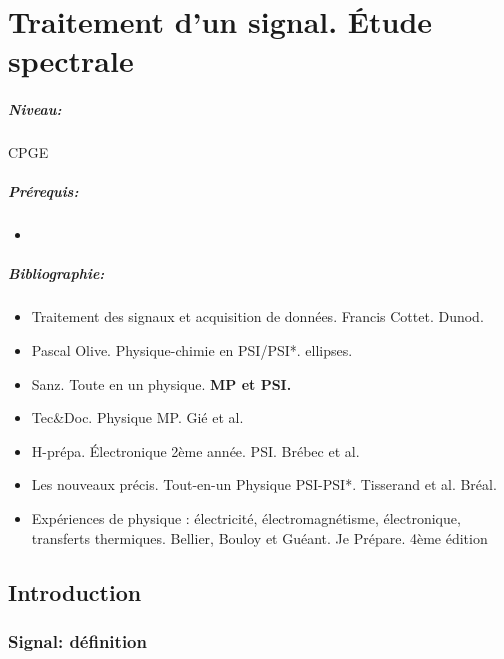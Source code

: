 \documentclass[11pt]{report}
\numberwithin{figure}{section}
\numberwithin{equation}{section}
\numberwithin{table}{section}
\newcommand{\1}{\boldsymbol{1}}
\begin{document}
\newpage



\chapter{Traitement d'un signal. Étude spectrale}

\paragraph*{Niveau:} CPGE
\paragraph*{Prérequis:} 
\begin{itemize}
\item 
\end{itemize}

\paragraph*{Bibliographie:}
\begin{itemize}
\item Traitement des signaux et acquisition de données. Francis Cottet. Dunod.
\item Pascal Olive. Physique-chimie en PSI/PSI*. ellipses.
\item Sanz. Toute en un physique. \textbf{MP et PSI.}
\item Tec\&Doc. Physique MP. Gié et al.
\item H-prépa. Électronique 2ème année. PSI. Brébec et al.
\item Les nouveaux précis. Tout-en-un Physique PSI-PSI*. Tisserand et al. Bréal.
\item Expériences de physique : électricité, électromagnétisme, électronique, transferts thermiques. Bellier, Bouloy et Guéant. Je Prépare. 4ème édition
\end{itemize}


\section*{Introduction}

\subsection*{Signal: définition}
\end{document}
